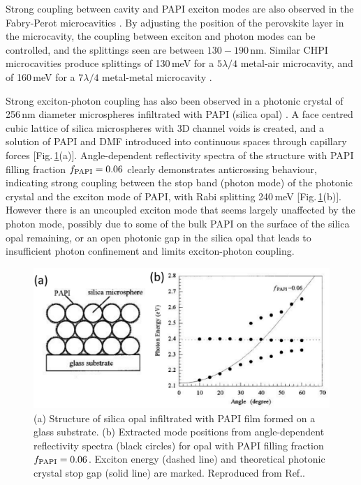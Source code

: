 Strong coupling between cavity and PAPI exciton modes are also observed in the Fabry-Perot microcavities \cite{Brehier2006, Lanty2008}. By adjusting the position of the perovskite layer in the microcavity, the coupling between exciton and photon modes can be controlled, and the splittings seen are between $130-190$\,nm. Similar CHPI microcavities produce splittings of 130\,meV for a $5\lambda/4$ metal-air microcavity, and of 160\,meV for a $7\lambda/4$ metal-metal microcavity \cite{Pradeesh2009b}.

Strong exciton-photon coupling has also been observed in a photonic crystal of 256\,nm diameter microspheres infiltrated with PAPI (silica opal) \cite{Sumioka2001}. A face centred cubic lattice of silica microspheres with 3D channel voids is created, and a solution of PAPI and DMF introduced into continuous spaces through capillary forces [Fig.\,\ref{2Fig21}(a)]. Angle-dependent reflectivity spectra of the structure with PAPI filling fraction $f_{\textnormal{PAPI}}=0.06$ clearly demonstrates anticrossing behaviour, indicating strong coupling between the stop band (photon mode) of the photonic crystal and the exciton mode of PAPI, with Rabi splitting 240\,meV [Fig.\,\ref{2Fig21}(b)]. However there is an uncoupled exciton mode that seems largely unaffected by the photon mode, possibly due to some of the bulk PAPI on the surface of the silica opal remaining, or an open photonic gap in the silica opal that leads to insufficient photon confinement and limits exciton-photon coupling. 
\begin{figure}[h!]
\centering
\includegraphics[width=\textwidth]{Fig21}
\caption{(a) Structure of silica opal infiltrated with PAPI film formed on a glass substrate. (b) Extracted mode positions from angle-dependent reflectivity spectra (black circles) for opal with PAPI filling fraction $f_{\textnormal{PAPI}}=0.06$. Exciton energy (dashed line) and theoretical photonic crystal stop gap (solid line) are marked. Reproduced from Ref.\!.}
\label{2Fig21}
\end{figure}

